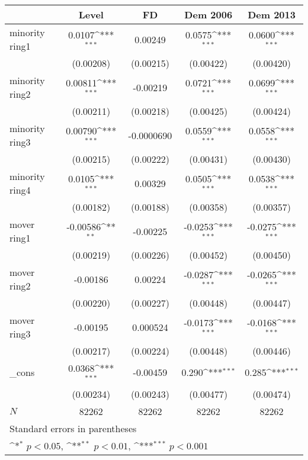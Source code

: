 {
\def\sym#1{\ifmmode^{#1}\else\(^{#1}\)\fi}
\begin{tabular}{l*{4}{c}}
\hline\hline
            &\multicolumn{1}{c}{Level}&\multicolumn{1}{c}{FD}&\multicolumn{1}{c}{Dem 2006}&\multicolumn{1}{c}{Dem 2013}\\
\hline
minority ring1&      0.0107\sym{***}&     0.00249         &      0.0575\sym{***}&      0.0600\sym{***}\\
            &   (0.00208)         &   (0.00215)         &   (0.00422)         &   (0.00420)         \\
[1em]
minority ring2&     0.00811\sym{***}&    -0.00219         &      0.0721\sym{***}&      0.0699\sym{***}\\
            &   (0.00211)         &   (0.00218)         &   (0.00425)         &   (0.00424)         \\
[1em]
minority ring3&     0.00790\sym{***}&  -0.0000690         &      0.0559\sym{***}&      0.0558\sym{***}\\
            &   (0.00215)         &   (0.00222)         &   (0.00431)         &   (0.00430)         \\
[1em]
minority ring4&      0.0105\sym{***}&     0.00329         &      0.0505\sym{***}&      0.0538\sym{***}\\
            &   (0.00182)         &   (0.00188)         &   (0.00358)         &   (0.00357)         \\
[1em]
mover ring1 &    -0.00586\sym{**} &    -0.00225         &     -0.0253\sym{***}&     -0.0275\sym{***}\\
            &   (0.00219)         &   (0.00226)         &   (0.00452)         &   (0.00450)         \\
[1em]
mover ring2 &    -0.00186         &     0.00224         &     -0.0287\sym{***}&     -0.0265\sym{***}\\
            &   (0.00220)         &   (0.00227)         &   (0.00448)         &   (0.00447)         \\
[1em]
mover ring3 &    -0.00195         &    0.000524         &     -0.0173\sym{***}&     -0.0168\sym{***}\\
            &   (0.00217)         &   (0.00224)         &   (0.00448)         &   (0.00446)         \\
[1em]
\_cons      &      0.0368\sym{***}&    -0.00459         &       0.290\sym{***}&       0.285\sym{***}\\
            &   (0.00234)         &   (0.00243)         &   (0.00477)         &   (0.00474)         \\
\hline
\(N\)       &       82262         &       82262         &       82262         &       82262         \\
\hline\hline
\multicolumn{5}{l}{\footnotesize Standard errors in parentheses}\\
\multicolumn{5}{l}{\footnotesize \sym{*} \(p<0.05\), \sym{**} \(p<0.01\), \sym{***} \(p<0.001\)}\\
\end{tabular}
}
